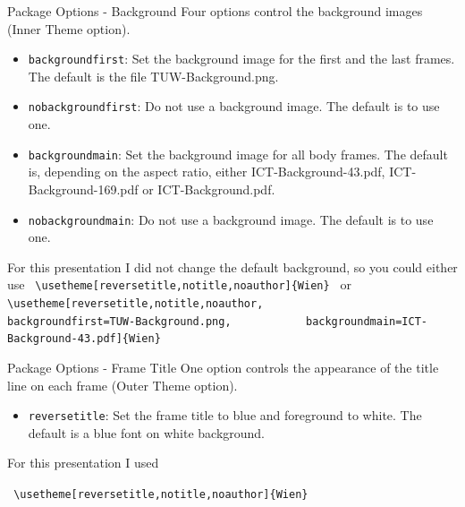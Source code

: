 \documentclass[aspectratio=169]{beamer}
\begin{document}
\begin{frame}[fragile]{Package Options - Background}
   Four options control the background images (Inner Theme option).
  
\begin{itemize}
\item \texttt{backgroundfirst}: Set the background image for the first and the last frames. The default is the file TUW-Background.png.
\item \texttt{nobackgroundfirst}: Do not use a background image. The default is to use one.
\item \texttt{backgroundmain}: Set the background image for all body
  frames. The default is, depending on the aspect ratio, either
  ICT-Background-43.pdf, ICT-Background-169.pdf or ICT-Background.pdf.
\item \texttt{nobackgroundmain}: Do not use a background image. The default is to use one.
\end{itemize}

For this presentation I did not change the default background, so you could either use
\verb| \usetheme[reversetitle,notitle,noauthor]{Wien} |
or
\verb| \usetheme[reversetitle,notitle,noauthor,|
\verb|           backgroundfirst=TUW-Background.png,|
\verb|           backgroundmain=ICT-Background-43.pdf]{Wien} |

\end{frame}
\begin{frame}[fragile]{Package Options - Frame Title}
   One option controls the appearance of the title line on each frame (Outer Theme option).
  
\begin{itemize}
\item \texttt{reversetitle}: Set the frame title to blue and
  foreground to white. The default is a blue font on white background.
\end{itemize}

For this presentation I used

\verb| \usetheme[reversetitle,notitle,noauthor]{Wien} |

\end{frame}
\end{document}
